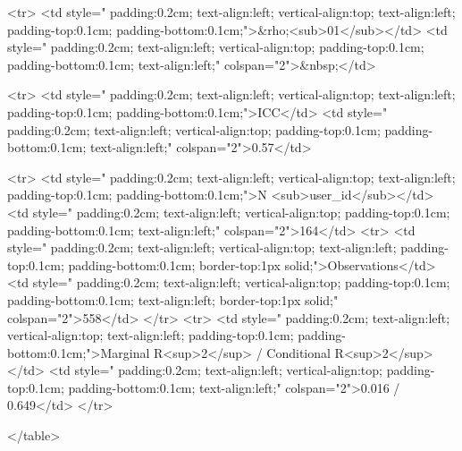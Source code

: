<tr>
<td style=" padding:0.2cm; text-align:left; vertical-align:top; text-align:left; padding-top:0.1cm; padding-bottom:0.1cm;">&rho;<sub>01</sub></td>
<td style=" padding:0.2cm; text-align:left; vertical-align:top; padding-top:0.1cm; padding-bottom:0.1cm; text-align:left;" colspan="2">&nbsp;</td>

<tr>
<td style=" padding:0.2cm; text-align:left; vertical-align:top; text-align:left; padding-top:0.1cm; padding-bottom:0.1cm;">ICC</td>
<td style=" padding:0.2cm; text-align:left; vertical-align:top; padding-top:0.1cm; padding-bottom:0.1cm; text-align:left;" colspan="2">0.57</td>

<tr>
<td style=" padding:0.2cm; text-align:left; vertical-align:top; text-align:left; padding-top:0.1cm; padding-bottom:0.1cm;">N <sub>user_id</sub></td>
<td style=" padding:0.2cm; text-align:left; vertical-align:top; padding-top:0.1cm; padding-bottom:0.1cm; text-align:left;" colspan="2">164</td>
<tr>
<td style=" padding:0.2cm; text-align:left; vertical-align:top; text-align:left; padding-top:0.1cm; padding-bottom:0.1cm; border-top:1px solid;">Observations</td>
<td style=" padding:0.2cm; text-align:left; vertical-align:top; padding-top:0.1cm; padding-bottom:0.1cm; text-align:left; border-top:1px solid;" colspan="2">558</td>
</tr>
<tr>
<td style=" padding:0.2cm; text-align:left; vertical-align:top; text-align:left; padding-top:0.1cm; padding-bottom:0.1cm;">Marginal R<sup>2</sup> / Conditional R<sup>2</sup></td>
<td style=" padding:0.2cm; text-align:left; vertical-align:top; padding-top:0.1cm; padding-bottom:0.1cm; text-align:left;" colspan="2">0.016 / 0.649</td>
</tr>

</table>

